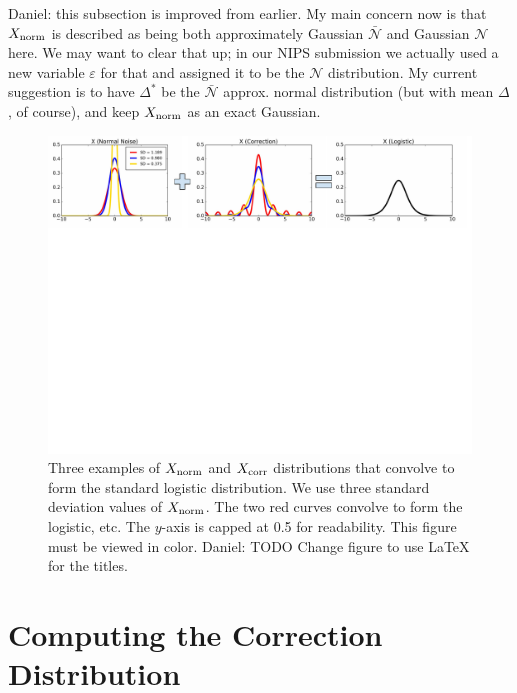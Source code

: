 \documentclass{article}
\begin{document}
{\color{blue} Daniel: this subsection is improved from earlier. My main concern
now is that $X_{\rm norm}$ is described as being both approximately Gaussian
$\bar{\mathcal{N}}$ and Gaussian $\mathcal{N}$ here. We may want to clear that
up; in our NIPS submission we actually used a new variable $\varepsilon$ for
that and assigned it to be the $\mathcal{N}$ distribution. My current
suggestion is to have $\Delta^*$ be the $\bar{\mathcal{N}}$ approx. normal
distribution (but with mean $\Delta$, of course), and keep $X_{\rm norm}$ as an
exact Gaussian.}

\begin{figure}[t]
    \centering
    \includegraphics[width=1\textwidth]{mh_convolution_diagram_v2}
    \caption{
    Three examples of $X_{\rm norm}$ and $X_{\rm corr}$ distributions that
    convolve to form the standard logistic distribution. We use three standard
    deviation values of $X_{\rm norm}$. The two red curves convolve to form the
    logistic, etc. The $y$-axis is capped at 0.5 for readability. This figure
    must be viewed in color. {\color{blue} Daniel: TODO Change figure to use
    LaTeX for the titles.}
    }
    \label{fig:deconvolution}
\end{figure}



\section{Computing the Correction Distribution}\label{sec:correction}
\end{document}
